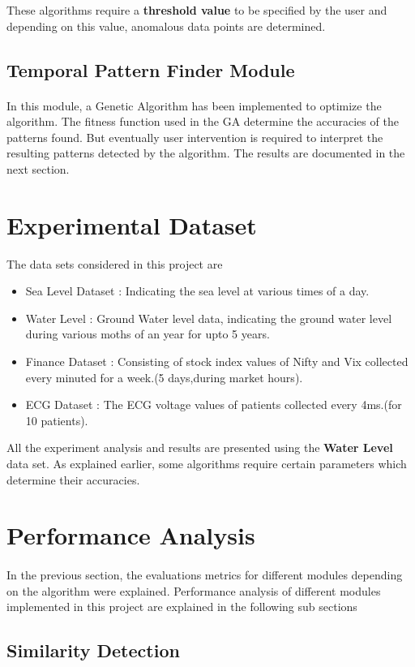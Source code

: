 \documentclass[12pt,a4paper]{report}
\begin{document}
These algorithms require a \textbf{threshold value} to be specified by the user and depending on this value, anomalous data points are determined.
\subsection{Temporal Pattern Finder Module}
\paragraph{} In this module, a Genetic Algorithm has been implemented to optimize the algorithm. The fitness function used in the GA determine the accuracies of the patterns found. But eventually user intervention is required to interpret the resulting patterns detected by the algorithm. The results are documented in the next section.
\section{Experimental Dataset}
The data sets considered in this project are
\begin{itemize}
\item Sea Level Dataset : Indicating the sea level at various times of a day.
\item Water Level : Ground Water level data, indicating the ground water level during various moths of an year for upto 5 years.
\item Finance Dataset : Consisting of stock index values of  Nifty and Vix collected every minuted for a week.(5 days,during market hours).
\item ECG Dataset : The ECG  voltage values of patients collected every 4ms.(for 10 patients).
\end{itemize}
All the experiment analysis and results are presented using the \textbf{Water Level} data set. As explained earlier, some algorithms require certain parameters which determine their accuracies.
\section{Performance Analysis}
\paragraph{} In the previous section, the evaluations metrics for different modules depending on the algorithm were explained. Performance analysis of different modules implemented in this project are explained in the following sub sections
\subsection{Similarity Detection}
\end{document}
